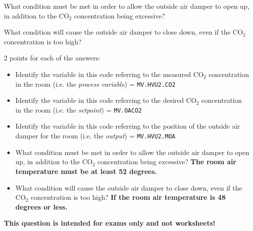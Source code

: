 \vskip 10pt

What condition must be met in order to allow the outside air damper to open up, in addition to the CO$_{2}$ concentration being excessive?

\vskip 10pt

What condition will cause the outside air damper to close down, even if the CO$_{2}$ concentration is too high?







2 points for each of the answers:

\begin{itemize}
\item{} Identify the variable in this code referring to the measured CO$_{2}$ concentration in the room (i.e. the {\it process variable}) = {\tt MV.HVU2.CO2}
\vskip 10pt
\item{} Identify the variable in this code referring to the desired CO$_{2}$ concentration in the room (i.e. the {\it setpoint}) = {\tt MV.OACO2}
\vskip 10pt
\item{} Identify the variable in this code referring to the position of the outside air damper for the room (i.e. the {\it output}) = {\tt MV.HVU2.MOA}
\vskip 10pt
\item{} What condition must be met in order to allow the outside air damper to open up, in addition to the CO$_{2}$ concentration being excessive? {\bf The room air temperature must be at least 52 degrees.}
\vskip 10pt
\item{} What condition will cause the outside air damper to close down, even if the CO$_{2}$ concentration is too high?  {\bf If the room air temperature is 48 degrees or less.}
\end{itemize}








{\bf This question is intended for exams only and not worksheets!}



